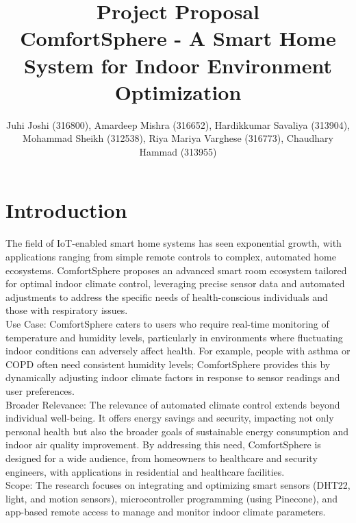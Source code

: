 \documentclass{article}
\begin{document}
\title{\huge\textbf{Project Proposal \\ ComfortSphere - A Smart Home System for Indoor Environment Optimization}}

\author{Juhi Joshi (316800), Amardeep Mishra (316652), Hardikkumar Savaliya (313904), Mohammad Sheikh (312538), 
Riya Mariya Varghese (316773), Chaudhary Hammad (313955) }


    

\maketitle
\section{Introduction}
{The field of IoT-enabled smart home systems has seen exponential growth, with applications ranging from simple remote controls to complex, automated home ecosystems. ComfortSphere proposes an advanced smart room ecosystem tailored for optimal indoor climate control, leveraging precise sensor data and automated adjustments to address the specific needs of health-conscious individuals and those with respiratory issues.\\

Use Case: ComfortSphere caters to users who require real-time monitoring of temperature and humidity levels, particularly in environments where fluctuating indoor conditions can adversely affect health. For example, people with asthma or COPD often need consistent humidity levels; ComfortSphere provides this by dynamically adjusting indoor climate factors in response to sensor readings and user preferences.\\

Broader Relevance: The relevance of automated climate control extends beyond individual well-being. It offers energy savings and security, impacting not only personal health but also the broader goals of sustainable energy consumption and indoor air quality improvement. By addressing this need, ComfortSphere is designed for a wide audience, from homeowners to healthcare and security engineers, with applications in residential and healthcare facilities.\\

Scope: The research focuses on integrating and optimizing smart sensors (DHT22, light, and motion sensors), microcontroller programming (using Pinecone), and app-based remote access to manage and monitor indoor climate parameters.
}
\end{document}
